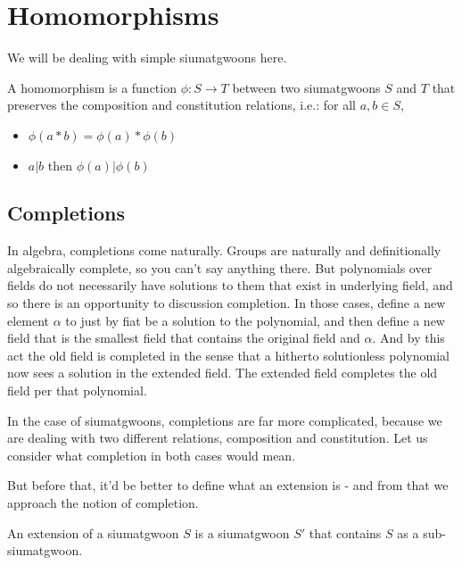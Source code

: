 \section{Homomorphisms}

We will be dealing with simple siumatgwoons here.

\begin{definition}[Homomorphism]
    A homomorphism is a function $\phi: S \to T$ between two siumatgwoons $S$ and $T$ that preserves the composition and constitution relations, i.e.: for all $a, b \in S$,
    \begin{itemize}
        \item $\phi(a * b) = \phi(a) * \phi(b)$
        \item $a | b$ then $\phi(a) | \phi(b)$
    \end{itemize}
\end{definition}

\subsection{Completions} 

In algebra, completions come naturally. Groups are naturally and definitionally algebraically complete, so you can't say anything there. But polynomials over fields do not necessarily have solutions to them that exist in underlying field, and so there is an opportunity to discussion completion. In those cases, define a new element $\alpha$ to just by fiat be a solution to the polynomial, and then define a new field that is the smallest field that contains the original field and $\alpha$. And by this act the old field is completed in the sense that a hitherto solutionless polynomial now sees a solution in the extended field. The extended field completes the old field per that polynomial. 

In the case of siumatgwoons, completions are far more complicated, because we are dealing with two different relations, composition and constitution. Let us consider what completion in both cases would mean.

But before that, it'd be better to define what an extension is - and from that we approach the notion of completion.

\begin{definition}[Extension]
    An extension of a siumatgwoon $S$ is a siumatgwoon $S'$ that contains $S$ as a sub-siumatgwoon.
\end{definition}


